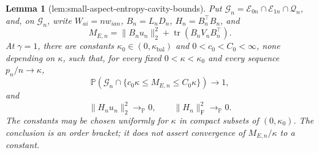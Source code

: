 \documentclass{article}
\newtheorem{lemma}{Lemma}
\begin{document}
\begin{lemma}[lem:small-aspect-entropy-cavity-bounds]\label{lem:small-aspect-entropy-cavity-bounds}
Put \(\mathcal G_n=\mathcal E_{0n}\cap\mathcal E_{1n}\cap\mathcal Q_n\), and, on \(\mathcal G_n\), write \(W_{ai}=nw_{ian}\), \(B_n=L_nD_n\), \(H_n=B_n^{\top}B_n\), and
\[
 M_{E,n}=\|B_nu_n\|_2^2+\operatorname{tr}(B_nV_nB_n^{\top}).
\]
At \(\gamma=1\), there are constants \(\kappa_0\in(0,\kappa_{\mathrm{bal}})\) and \(0<c_0<C_0<\infty\), none depending on \(\kappa\), such that, for every fixed \(0<\kappa<\kappa_0\) and every sequence \(p_n/n\to\kappa\),
\[
 \mathbb P\!\left(\mathcal G_n\cap
 \{c_0\kappa\le M_{E,n}\le C_0\kappa\}\right)\longrightarrow1,
\]
and
\[
 \|H_nu_n\|_2^2\longrightarrow_{\mathbb P}0,
 \qquad
 \|H_n\|_{\mathrm F}^2\longrightarrow_{\mathbb P}0.
\]
The constants may be chosen uniformly for \(\kappa\) in compact subsets of \((0,\kappa_0)\).  The conclusion is an order bracket; it does not assert convergence of \(M_{E,n}/\kappa\) to a constant.
\end{lemma}
\end{document}
